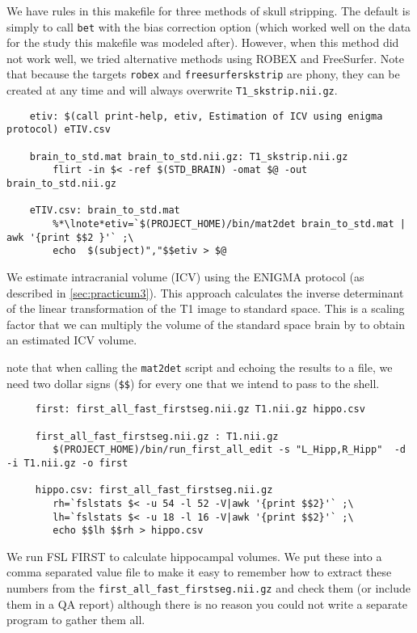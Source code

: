 We have rules in this makefile for three methods of skull
stripping. The default is simply to call \texttt{bet} with the bias
correction option (which worked well on the data for the study this
makefile was modeled after). However, when this method did not work
well, we tried alternative methods using ROBEX and FreeSurfer. Note
that because the targets \texttt{robex} and \texttt{freesurferskstrip}
are phony, they can be created at any time and will always overwrite
\texttt{T1_skstrip.nii.gz}. 


\begin{lstlisting}
	etiv: $(call print-help, etiv, Estimation of ICV using enigma protocol) eTIV.csv

	brain_to_std.mat brain_to_std.nii.gz: T1_skstrip.nii.gz 
		flirt -in $< -ref $(STD_BRAIN) -omat $@ -out brain_to_std.nii.gz

	eTIV.csv: brain_to_std.mat
		%*\lnote*etiv=`$(PROJECT_HOME)/bin/mat2det brain_to_std.mat | awk '{print $$2 }'` ;\
		echo  $(subject)","$$etiv > $@
\end{lstlisting}

We estimate intracranial volume (ICV) using the ENIGMA protocol (as described in
\autoref{sec:practicum3}). This approach calculates the inverse 
determinant of the linear transformation of the T1 image to standard
space. This is a scaling factor that we can multiply the volume of the
standard space brain by to obtain an estimated ICV volume. 

 note that when calling the \texttt{mat2det} script and
echoing the results to a file, we need two dollar signs (\texttt{\$\$})
for every one that we intend to pass to the shell.  



\begin{lstlisting}
	 first: first_all_fast_firstseg.nii.gz T1.nii.gz hippo.csv

	 first_all_fast_firstseg.nii.gz : T1.nii.gz
		$(PROJECT_HOME)/bin/run_first_all_edit -s "L_Hipp,R_Hipp"  -d -i T1.nii.gz -o first

	 hippo.csv: first_all_fast_firstseg.nii.gz 
		rh=`fslstats $< -u 54 -l 52 -V|awk '{print $$2}'` ;\
		lh=`fslstats $< -u 18 -l 16 -V|awk '{print $$2}'` ;\
		echo $$lh $$rh > hippo.csv
\end{lstlisting}

We run FSL FIRST to calculate hippocampal volumes. We put these into a
comma separated value file to make it easy to remember how to extract
these numbers from the \texttt{first_all_fast_firstseg.nii.gz} and
check them (or include them in a QA report) although there is no
reason you could not write a separate program to gather them all.


